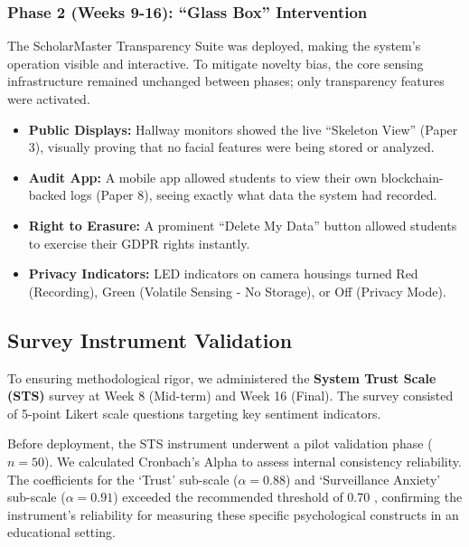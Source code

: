 \documentclass[conference]{IEEEtran}
\begin{document}
\subsubsection{Phase 2 (Weeks 9-16): ``Glass Box'' Intervention}
The ScholarMaster Transparency Suite was deployed, making the system's operation visible and interactive. To mitigate novelty bias, the core sensing infrastructure remained unchanged between phases; only transparency features were activated.
\begin{itemize}
    \item \textbf{Public Displays:} Hallway monitors showed the live ``Skeleton View'' (Paper 3), visually proving that no facial features were being stored or analyzed.
    \item \textbf{Audit App:} A mobile app allowed students to view their own blockchain-backed logs (Paper 8), seeing exactly what data the system had recorded.
    \item \textbf{Right to Erasure:} A prominent ``Delete My Data'' button allowed students to exercise their GDPR rights instantly.
    \item \textbf{Privacy Indicators:} LED indicators on camera housings turned Red (Recording), Green (Volatile Sensing - No Storage), or Off (Privacy Mode).
\end{itemize}

\subsection{Survey Instrument Validation}
To ensuring methodological rigor, we administered the \textbf{System Trust Scale (STS)} survey at Week 8 (Mid-term) and Week 16 (Final). The survey consisted of 5-point Likert scale questions targeting key sentiment indicators.

Before deployment, the STS instrument underwent a pilot validation phase ($n=50$). We calculated Cronbach's Alpha to assess internal consistency reliability. The coefficients for the `Trust' sub-scale ($\alpha = 0.88$) and `Surveillance Anxiety' sub-scale ($\alpha = 0.91$) exceeded the recommended threshold of 0.70 \cite{b25}, confirming the instrument's reliability for measuring these specific psychological constructs in an educational setting.
\end{document}
